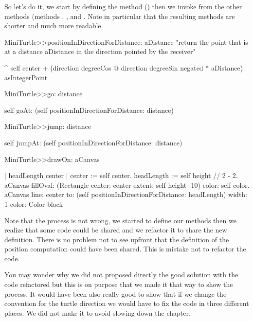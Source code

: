 So let's do it, we start by defining the method
 () then we
invoke from the other methods (methods ,
, and . Note in
particular that the resulting methods are shorter and much more
readable.

\begin{method}\label{mth:position}
MiniTurtle>>positionInDirectionForDistance: aDistance
  "return the point that is at a distance aDistance in the direction
  pointed by the receiver"

  ^ self center 
      + (direction degreeCos @ direction degreeSin negated
            * aDistance) asIntegerPoint 
\end{method}

\begin{method}\label{mth:gofinal}
MiniTurtle>>go: distance

   self goAt: (self positionInDirectionForDistance: distance)
\end{method}

\begin{method}\label{mth:jumpfinal}
MiniTurtle>>jump: distance

  self jumpAt: (self positionInDirectionForDistance: distance)
\end{method}

\begin{method}\label{mth:drawOnfinal}
MiniTurtle>>drawOn: aCanvas
   
   | headLength center |
   center := self center.
   headLength := self height // 2 - 2.
   aCanvas 
      fillOval: (Rectangle center: center extent: self height -10)
      color: self color.
   aCanvas
      line: center
      to: (self positionInDirectionForDistance: headLength)
      width: 1
      color: Color black
\end{method}


Note that the process is not wrong, we started to define our methods
then we realize that some code could be shared and we refactor it to
share the new definition. There is no problem not to see upfront that
the definition of the position computation could have been
shared. This is mistake not to refactor the code. 

\begin{teacher} 
You may wonder why we did not proposed directly the good solution with
the code refactored but this is on purpose that we made it that way to
show the process. It would have been also really good to show that if
we change the convention for the turtle direction we would have to fix
the code in three different places. We did not make it to avoid
slowing down the chapter.
\end{teacher}

